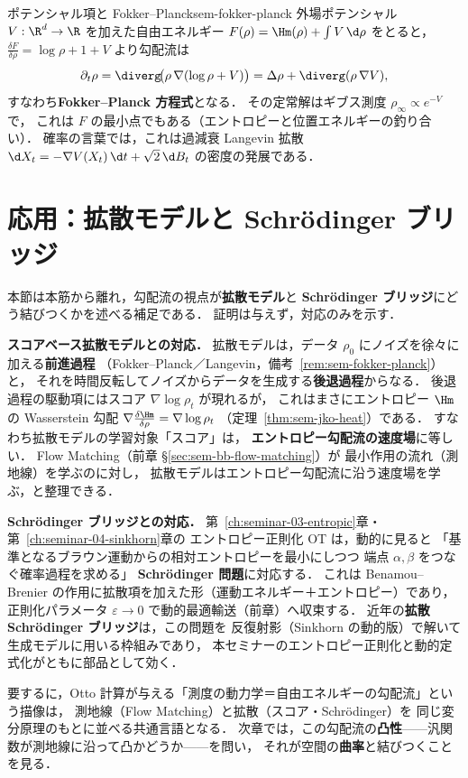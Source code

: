 \begin{remark}{ポテンシャル項と Fokker--Planck}{sem-fokker-planck}
  外場ポテンシャル $V:\R^d\to\R$ を加えた自由エネルギー
  $F(\rho)=\Hm(\rho)+\int V\,\d\rho$ をとると，
  $\tfrac{\delta F}{\delta\rho}=\log\rho+1+V$ より勾配流は
  \[
    \partial_t\rho
    = \diverg\!\bigl(\rho\,\nabla(\log\rho+V)\bigr)
    = \Delta\rho + \diverg(\rho\,\nabla V),
  \]
  すなわち\textbf{Fokker--Planck 方程式}となる．
  その定常解はギブス測度 $\rho_\infty\propto e^{-V}$ で，
  これは $F$ の最小点でもある（エントロピーと位置エネルギーの釣り合い）．
  確率の言葉では，これは過減衰 Langevin 拡散
  $\d X_t=-\nabla V(X_t)\,\d t+\sqrt2\,\d B_t$ の密度の発展である．
\end{remark}

\section{応用：拡散モデルと Schrödinger ブリッジ}
\label{sec:sem-otto-diffusion}

本節は本筋から離れ，勾配流の視点が\textbf{拡散モデル}と
\textbf{Schrödinger ブリッジ}にどう結びつくかを述べる補足である．
証明は与えず，対応のみを示す．

\begin{memo*}
  \textbf{スコアベース拡散モデルとの対応．}
  拡散モデルは，データ $\rho_0$ にノイズを徐々に加える\textbf{前進過程}
  （Fokker--Planck／Langevin，備考~\ref{rem:sem-fokker-planck}）と，
  それを時間反転してノイズからデータを生成する\textbf{後退過程}からなる．
  後退過程の駆動項にはスコア $\nabla\log\rho_t$ が現れるが，
  これはまさにエントロピー $\Hm$ の Wasserstein 勾配
  $\nabla\tfrac{\delta\Hm}{\delta\rho}=\nabla\log\rho_t$
  （定理~\ref{thm:sem-jko-heat}）である．
  すなわち拡散モデルの学習対象「スコア」は，
  \textbf{エントロピー勾配流の速度場}に等しい．
  Flow Matching（前章 §\ref{sec:sem-bb-flow-matching}）が
  最小作用の流れ（測地線）を学ぶのに対し，
  拡散モデルはエントロピー勾配流に沿う速度場を学ぶ，と整理できる．
\end{memo*}

\begin{memo*}
  \textbf{Schrödinger ブリッジとの対応．}
  第~\ref{ch:seminar-03-entropic}章・第~\ref{ch:seminar-04-sinkhorn}章の
  エントロピー正則化 OT は，動的に見ると
  「基準となるブラウン運動からの相対エントロピーを最小にしつつ
  端点 $\alpha,\beta$ をつなぐ確率過程を求める」
  \textbf{Schrödinger 問題}に対応する．
  これは Benamou--Brenier の作用に拡散項を加えた形（運動エネルギー＋エントロピー）であり，
  正則化パラメータ $\varepsilon\to0$ で動的最適輸送（前章）へ収束する．
  近年の\textbf{拡散 Schrödinger ブリッジ}は，この問題を
  反復射影（Sinkhorn の動的版）で解いて生成モデルに用いる枠組みであり，
  本セミナーのエントロピー正則化と動的定式化がともに部品として効く．
\end{memo*}

要するに，Otto 計算が与える「測度の動力学＝自由エネルギーの勾配流」という描像は，
測地線（Flow Matching）と拡散（スコア・Schrödinger）を
同じ変分原理のもとに並べる共通言語となる．
次章では，この勾配流の\textbf{凸性}——汎関数が測地線に沿って凸かどうか——を問い，
それが空間の\textbf{曲率}と結びつくことを見る．
